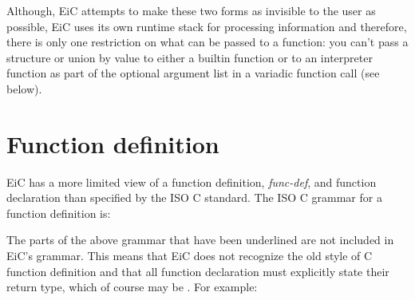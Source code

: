 Although, EiC attempts to make these two forms as invisible to the
user as possible, EiC uses its own runtime stack for processing
information and therefore, there is only one restriction on what can
be passed to a function: you can't pass a structure or union by value
to either a builtin function or to an interpreter function as part of
the optional argument list in a variadic function call (see below).


\section{Function definition}
\label{sec:FunctionDefinition}

EiC has a more limited view of a function definition, {\it func-def}, 
and function declaration than specified by the ISO C standard. The
ISO C grammar for a function definition is:
\begin{quote}
\end{quote}

The parts of the above grammar that have been underlined are not included
in EiC's grammar. This means that EiC does not recognize the old
style of C function definition and that all function declaration must
explicitly state their return type, which of course may be . For
example:

